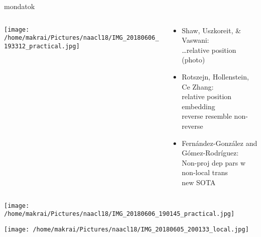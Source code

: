 \documentclass{beamer}
\begin{document}
   \begin{frame}{mondatok}
     \begin{columns}\begin{column}{.35\textwidth}\centering \texttt{[image: /home/makrai/Pictures/naacl18/IMG\_20180606\_193312\_practical.jpg]}\end{column}\begin{column}{.65\textwidth}
       \begin{itemize}
         \item Shaw, Uszkoreit, \& Vaswani: \\  \dots \alert{relative position} (photo)
         \item Rotszejn, Hollenstein, Ce Zhang: \\  relative position embedding
           \\ reverse resemble non-reverse
         \item Fernández-González and Gómez-Rodríguez: \\  Non-proj dep pars w non-local trans 
           \\ new SOTA
       \end{itemize}
   \end{column} \end{columns}
 \end{frame}

 \begin{frame}[allowframebreaks]
   \texttt{[image: /home/makrai/Pictures/naacl18/IMG\_20180606\_190145\_practical.jpg]} 

   \texttt{[image: /home/makrai/Pictures/naacl18/IMG\_20180605\_200133\_local.jpg]}
 \end{frame}

\end{document}

